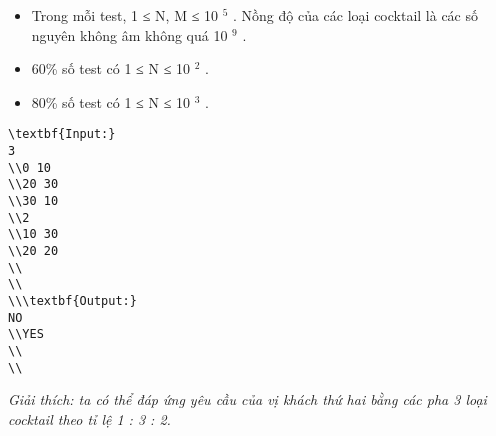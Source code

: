 \begin{itemize}
	\item     Trong mỗi test, 1 ≤ N, M ≤ 10    $^     5    $    . Nồng độ của các loại cocktail là các số nguyên không âm không quá 10    $^     9    $    .   
	\item     60\% số test có 1 ≤ N ≤ 10    $^     2    $    .   
	\item     80\% số test có 1 ≤ N ≤ 10    $^     3    $    .   
\end{itemize}
\begin{verbatim}
\textbf{Input:}
3
\\0 10
\\20 30 
\\30 10
\\2
\\10 30
\\20 20
\\
\\
\\\textbf{Output:}
NO
\\YES
\\
\\\end{verbatim}

\emph{    Giải thích: ta có thể đáp ứng yêu cầu của vị khách thứ hai bằng các pha 3 loại cocktail theo tỉ lệ 1 : 3 : 2.   }